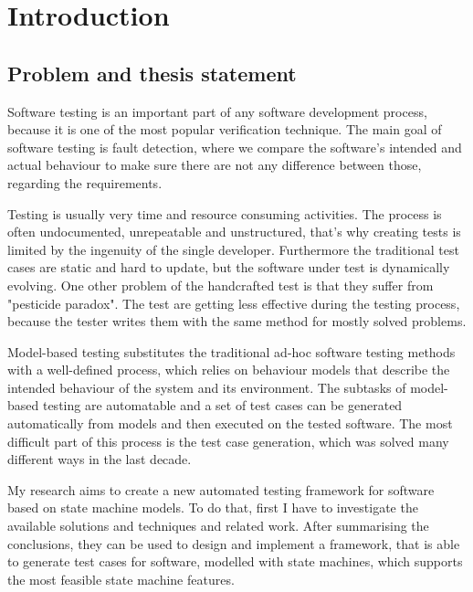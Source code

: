 \chapter*{Introduction}
\label{cha:introduction}

\section*{Problem and thesis statement}
\label{sec:problem}

Software testing is an important part of any software development process, because it is one of the most popular verification technique. The main goal of software testing is fault detection, where we compare the software's intended and actual behaviour to make sure there are not any difference between those, regarding the requirements.

Testing is usually very time and resource consuming activities. The process is often undocumented, unrepeatable and unstructured, that's why creating tests is limited by the ingenuity of the single developer. Furthermore the traditional test cases are static and hard to update, but the software under test is dynamically evolving. One other problem of the handcrafted test is that they suffer from "pesticide paradox". The test are getting less effective during the testing process, because the tester writes them with the same method for mostly solved problems.

Model-based testing substitutes the traditional ad-hoc software testing methods with a well-defined process, which relies on behaviour models that describe the intended behaviour of the system and its environment. The subtasks of model-based testing are automatable and a set of test cases can be generated automatically from models and then executed on the tested software. The most difficult part of this process is the test case generation, which was solved many different ways in the last decade.

My research aims to create a new automated testing framework for software based on state machine models. To do that, first I have to investigate the available solutions and techniques and related work. After summarising the conclusions, they can be used to design and implement a framework, that is able to generate test cases for software, modelled with state machines, which supports the most feasible state machine features.

